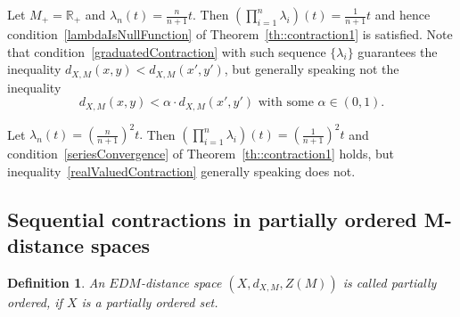 \documentclass[12pt]{amsart}          %
\newtheorem{definition}{Definition}
\newcommand{\RR}{\mathbb R}
\begin{document}
Let $M_+=\RR_+$ and $\lambda_n(t)=\frac n{n+1}t.$  Then $\left(\prod\nolimits_{i=1}^n\lambda_i\right)(t)=\frac 1{n+1}t$ and hence condition~\eqref{lambdaIsNullFunction} of Theorem~\ref{th::contraction1} is satisfied. Note that condition~\eqref{graduatedContraction} with such sequence $\{\lambda_i\}$ guarantees the inequality 
$d_{X,M}(x,y)< d_{X,M}(x',y')$, but generally speaking not the inequality 
\begin{equation}\label{realValuedContraction}
   d_{X,M}(x,y)< \alpha\cdot d_{X,M}(x',y')\text{ with some } \alpha\in (0,1). 
\end{equation}

Let $\lambda_n(t)=\left(\frac n{n+1}\right)^2t. $  Then $\left(\prod\nolimits_{i=1}^n\lambda_i\right)(t)=\left(\frac 1{n+1}\right)^2t$ and condition~\eqref{seriesConvergence} of Theorem~\ref{th::contraction1} holds, but inequality~\eqref{realValuedContraction} generally speaking does not.

\subsection{Sequential contractions in partially ordered M-distance spaces}

\begin{definition}
An $EDM$-distance space $(X,d_{X,M}, Z(M))$ is called partially ordered, if $X$ is a partially ordered set.
\end{definition}
\end{document}
